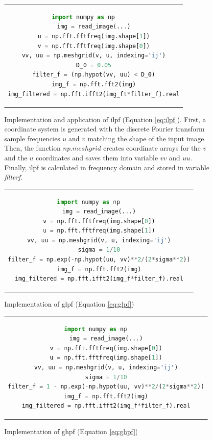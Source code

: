 \begin{figure}[htpb]
	\begin{tabular}{c}
	\begin{lstlisting}[language=Python]
import numpy as np		
img = read_image(...)
u = np.fft.fftfreq(img.shape[1])
v = np.fft.fftfreq(img.shape[0])
vv, uu = np.meshgrid(v, u, indexing='ij')
D_0 = 0.05
filter_f = (np.hypot(vv, uu) < D_0)
img_f = np.fft.fft2(img)
img_filtered = np.fft.ifft2(img_ft*filter_f).real
	\end{lstlisting}
	\end{tabular}
	\caption[Example listing]{Implementation and application of \gls{ilpf} (Equation \ref{eq:ilpf}). First, a coordinate system is generated with the discrete Fourier transform sample frequencies $u$ and $v$ matching the shape of the input image. Then, the function $np.meshgrid$ creates coordinate arrays for the $v$ and the $u$ coordinates and saves them into variable $vv$ and $uu$. Finally, \gls{ilpf} is calculated in frequency domain and stored in variable \emph{filter\textunderscore f}.}
\label{code:ilpf}
\end{figure}

\begin{figure}[htpb]
	\begin{tabular}{c}
	\begin{lstlisting}[language=Python]
import numpy as np		
img = read_image(...)
v = np.fft.fftfreq(img.shape[0])
u = np.fft.fftfreq(img.shape[1])
vv, uu = np.meshgrid(v, u, indexing='ij')
sigma = 1/10
filter_f = np.exp(-np.hypot(uu, vv)**2/(2*sigma**2))
img_f = np.fft.fft2(img)
img_filtered = np.fft.ifft2(img_f*filter_f).real
	\end{lstlisting}
	\end{tabular}
	\caption[Example listing]{Implementation of \gls{glpf} (Equation \ref{eq:glpf})}
\label{code:glpf}
\end{figure}

\begin{figure}[htpb]
	\begin{tabular}{c}
	\begin{lstlisting}[language=Python]
import numpy as np		
img = read_image(...)
v = np.fft.fftfreq(img.shape[0])
u = np.fft.fftfreq(img.shape[1])
vv, uu = np.meshgrid(v, u, indexing='ij')
sigma = 1/10
filter_f = 1 - np.exp(-np.hypot(uu, vv)**2/(2*sigma**2))
img_f = np.fft.fft2(img)
img_filtered = np.fft.ifft2(img_f*filter_f).real
	\end{lstlisting}
	\end{tabular}
	\caption[Example listing]{Implementation of \gls{ghpf} (Equation \ref{eq:ghpf})}
\label{code:ghpf}
\end{figure}

